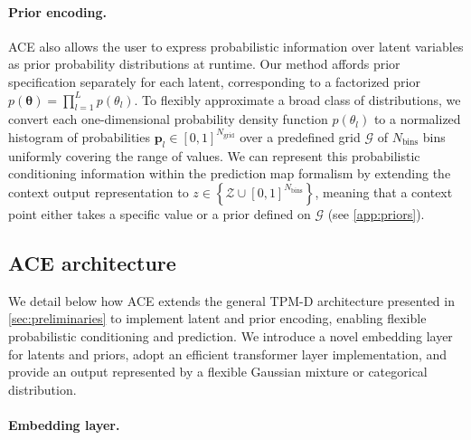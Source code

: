 \documentclass[twoside]{article}
\newcommand{\vtheta}{{\bm{\theta}}}
\begin{document}
\paragraph{Prior encoding.} \label{sec:prior} ACE also allows the user to express probabilistic information over latent variables as prior probability distributions at runtime. Our method affords prior specification separately for each latent, corresponding to a factorized prior $p(\vtheta) = \prod_{l=1}^L p(\theta_l)$. To flexibly approximate a broad class of distributions, we convert each one-dimensional probability density function $p(\theta_l)$ to a normalized histogram of probabilities $\mathbf{p}_l \in [0, 1]^{N_\text{grid}}$ over a predefined grid $\mathcal{G}$ of $N_\text{bins}$ bins uniformly covering the range of values. We can represent this probabilistic conditioning information within the prediction map formalism by extending the context output representation to $z \in \left\{ \mathcal{Z} \cup  [0,1]^{N_\text{bins}} \right\}$, meaning that a context point either takes a specific value or a prior defined on $\mathcal{G}$ (see \cref{app:priors}).



\subsection{ACE architecture}

We detail below how ACE extends the general TPM-D architecture presented in \cref{sec:preliminaries} to implement latent and prior encoding, enabling flexible probabilistic conditioning and prediction. We introduce a novel  embedding layer for latents and priors,  adopt an efficient transformer layer implementation, and provide an output represented by a flexible Gaussian mixture or categorical distribution.

\vspace{-0.25em}
\paragraph{Embedding layer.}
\end{document}
